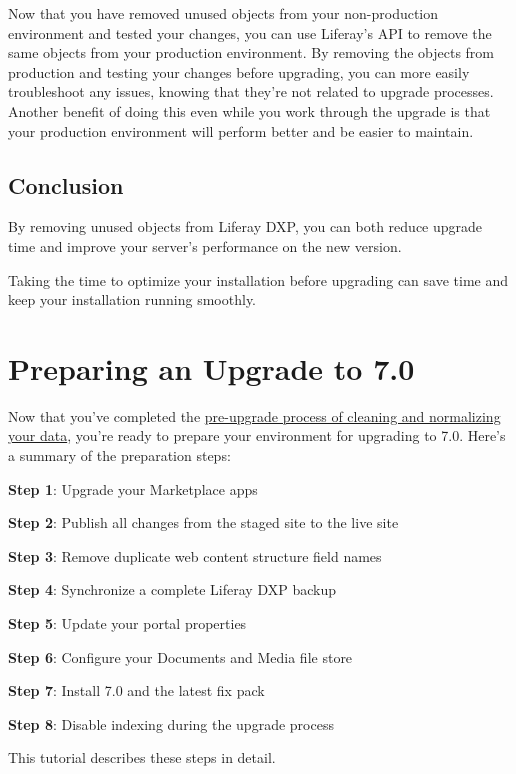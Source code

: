 Now that you have removed unused objects from your non-production
environment and tested your changes, you can use Liferay's API to remove
the same objects from your production environment. By removing the
objects from production and testing your changes before upgrading, you
can more easily troubleshoot any issues, knowing that they're not
related to upgrade processes. Another benefit of doing this even while
you work through the upgrade is that your production environment will
perform better and be easier to maintain.

\subsection{Conclusion}\label{conclusion}

By removing unused objects from Liferay DXP, you can both reduce upgrade
time and improve your server's performance on the new version.

Taking the time to optimize your installation before upgrading can save
time and keep your installation running smoothly.

\section{Preparing an Upgrade to
7.0}\label{preparing-an-upgrade-to-7.0}

Now that you've completed the
\href{/docs/7-0/deploy/-/knowledge_base/d/pre-upgrade-speed-up-the-process}{pre-upgrade
process of cleaning and normalizing your data}, you're ready to prepare
your environment for upgrading to 7.0. Here's a summary of the
preparation steps:

\textbf{Step 1}: Upgrade your Marketplace apps

\textbf{Step 2}: Publish all changes from the staged site to the live
site

\textbf{Step 3}: Remove duplicate web content structure field names

\textbf{Step 4}: Synchronize a complete Liferay DXP backup

\textbf{Step 5}: Update your portal properties

\textbf{Step 6}: Configure your Documents and Media file store

\textbf{Step 7}: Install 7.0 and the latest fix pack

\textbf{Step 8}: Disable indexing during the upgrade process

This tutorial describes these steps in detail.

